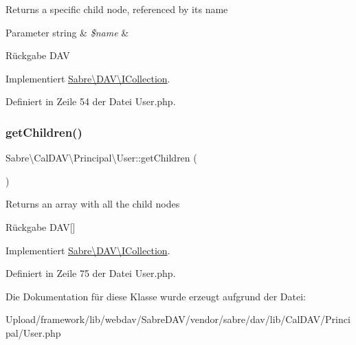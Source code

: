 Returns a specific child node, referenced by its name


\begin{DoxyParams}[1]{Parameter}
string & {\em \$name} & \\
\hline
\end{DoxyParams}
\begin{DoxyReturn}{Rückgabe}
D\+AV 
\end{DoxyReturn}


Implementiert \mbox{\hyperlink{interface_sabre_1_1_d_a_v_1_1_i_collection_a09f82b07550611752abb149f468b89c2}{Sabre\textbackslash{}\+D\+A\+V\textbackslash{}\+I\+Collection}}.



Definiert in Zeile 54 der Datei User.\+php.

\mbox{\label{class_sabre_1_1_cal_d_a_v_1_1_principal_1_1_user_a98c22dc6958f352eadf92c960bd3bf19}} 
\subsubsection{\texorpdfstring{get\+Children()}{getChildren()}}
{\footnotesize\ttfamily Sabre\textbackslash{}\+Cal\+D\+A\+V\textbackslash{}\+Principal\textbackslash{}\+User\+::get\+Children (\begin{DoxyParamCaption}{ }\end{DoxyParamCaption})}

Returns an array with all the child nodes

\begin{DoxyReturn}{Rückgabe}
D\+AV\mbox{[}\mbox{]} 
\end{DoxyReturn}


Implementiert \mbox{\hyperlink{interface_sabre_1_1_d_a_v_1_1_i_collection_a5344a6890e49fd7a81bb0e38b4c6d0be}{Sabre\textbackslash{}\+D\+A\+V\textbackslash{}\+I\+Collection}}.



Definiert in Zeile 75 der Datei User.\+php.



Die Dokumentation für diese Klasse wurde erzeugt aufgrund der Datei\+:\begin{DoxyCompactItemize}
\item 
Upload/framework/lib/webdav/\+Sabre\+D\+A\+V/vendor/sabre/dav/lib/\+Cal\+D\+A\+V/\+Principal/User.\+php\end{DoxyCompactItemize}
